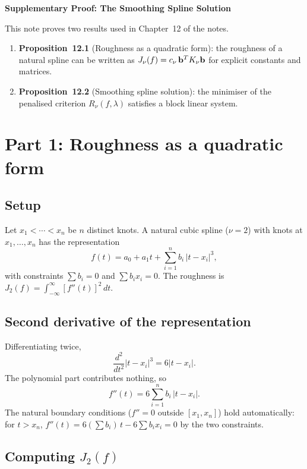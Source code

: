 



\moduleheader

\begin{center}
  {\Large\bfseries Supplementary Proof: The Smoothing Spline Solution}
\end{center}

\bigskip

\noindent This note proves two results used in Chapter~12 of the notes.
\begin{enumerate}
  \item \textbf{Proposition~12.1} (Roughness as a quadratic form): the
    roughness of a natural spline can be written as
    $J_\nu(f) = c_\nu\,\mathbf{b}^T K_\nu \mathbf{b}$ for explicit constants and
    matrices.
  \item \textbf{Proposition~12.2} (Smoothing spline solution): the
    minimiser of the penalised criterion $R_\nu(f,\lambda)$ satisfies a
    block linear system.
\end{enumerate}

\section*{Part 1: Roughness as a quadratic form}

\subsection*{Setup}

Let $x_1 < \cdots < x_n$ be $n$ distinct knots.  A natural cubic
spline ($\nu=2$) with knots at $x_1,\dots,x_n$ has the representation
\[
  f(t) = a_0 + a_1 t + \sum_{i=1}^n b_i\,|t-x_i|^3,
\]
with constraints $\sum b_i = 0$ and $\sum b_i x_i = 0$.  The roughness
is $J_2(f) = \int_{-\infty}^{\infty}[f''(t)]^2\,dt$.

\subsection*{Second derivative of the representation}

Differentiating twice,
\[
  \frac{d^2}{dt^2}|t-x_i|^3 = 6|t-x_i|.
\]
The polynomial part contributes nothing, so
\[
  f''(t) = 6\sum_{i=1}^n b_i\,|t-x_i|.
\]
The natural boundary conditions ($f''=0$ outside $[x_1,x_n]$) hold
automatically: for $t > x_n$, $f''(t) = 6(\sum b_i)\,t - 6\sum b_i x_i = 0$
by the two constraints.

\subsection*{Computing $J_2(f)$}

